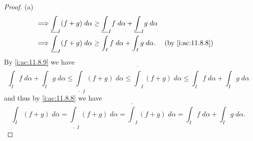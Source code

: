 \begin{proof}{(a)}
\begin{align*}
    \implies & \underline{\int}_I (f + g) \; d \alpha \geq \underline{\int}_I f \; d \alpha + \underline{\int}_I g \; d \alpha &                                              \\
    \implies & \underline{\int}_I (f + g) \; d \alpha \geq \int_I f \; d \alpha + \int_I g \; d \alpha.                        &   & \by{i:ac:11.8.8}
  \end{align*}
  By \cref{i:ac:11.8.9} we have
  \[
    \int_I f \; d \alpha + \int_I g \; d \alpha \leq \underline{\int}_I (f + g) \; d \alpha \leq \overline{\int}_I (f + g) \; d \alpha \leq \int_I f \; d \alpha + \int_I g \; d \alpha
  \]
  and thus by \cref{i:ac:11.8.8} we have
  \[
    \int_I (f + g) \; d \alpha = \underline{\int}_I (f + g) \; d \alpha = \overline{\int}_I (f + g) \; d \alpha = \int_I f \; d \alpha + \int_I g \; d \alpha.
  \]
\end{proof}

